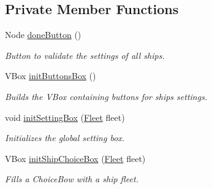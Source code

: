 \subsection*{Private Member Functions}
\begin{DoxyCompactItemize}
\item 
Node \hyperlink{classbattleship2D_1_1ui_1_1ShipInsertion_ad651fa33c63ab20273c3f8d3e66d59a7}{done\-Button} ()
\begin{DoxyCompactList}\small\item\em Button to validate the settings of all ships. \end{DoxyCompactList}\item 
V\-Box \hyperlink{classbattleship2D_1_1ui_1_1ShipInsertion_af2d112826592452a82f98b16d3c2a530}{init\-Buttons\-Box} ()
\begin{DoxyCompactList}\small\item\em Builds the V\-Box containing buttons for ships settings. \end{DoxyCompactList}\item 
void \hyperlink{classbattleship2D_1_1ui_1_1ShipInsertion_a9657ee43a97a364d27b6aa9c822382f9}{init\-Setting\-Box} (\hyperlink{classbattleship2D_1_1model_1_1Fleet}{Fleet} fleet)
\begin{DoxyCompactList}\small\item\em Initializes the global setting box. \end{DoxyCompactList}\item 
V\-Box \hyperlink{classbattleship2D_1_1ui_1_1ShipInsertion_a8f67e90a26d748f9190782c4009f6bba}{init\-Ship\-Choice\-Box} (\hyperlink{classbattleship2D_1_1model_1_1Fleet}{Fleet} fleet)
\begin{DoxyCompactList}\small\item\em Fills a Choice\-Bow with a ship fleet. \end{DoxyCompactList}\end{DoxyCompactItemize}
